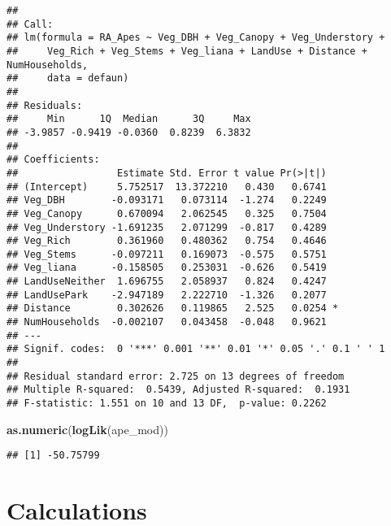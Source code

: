 \documentclass[]{book}
\newenvironment{Shaded}{\begin{snugshade}}{\end{snugshade}}
\newcommand{\KeywordTok}[1]{\textcolor[rgb]{0.13,0.29,0.53}{\textbf{#1}}}
\newcommand{\NormalTok}[1]{#1}
\begin{document}
\begin{verbatim}
## 
## Call:
## lm(formula = RA_Apes ~ Veg_DBH + Veg_Canopy + Veg_Understory + 
##     Veg_Rich + Veg_Stems + Veg_liana + LandUse + Distance + NumHouseholds, 
##     data = defaun)
## 
## Residuals:
##     Min      1Q  Median      3Q     Max 
## -3.9857 -0.9419 -0.0360  0.8239  6.3832 
## 
## Coefficients:
##                 Estimate Std. Error t value Pr(>|t|)  
## (Intercept)     5.752517  13.372210   0.430   0.6741  
## Veg_DBH        -0.093171   0.073114  -1.274   0.2249  
## Veg_Canopy      0.670094   2.062545   0.325   0.7504  
## Veg_Understory -1.691235   2.071299  -0.817   0.4289  
## Veg_Rich        0.361960   0.480362   0.754   0.4646  
## Veg_Stems      -0.097211   0.169073  -0.575   0.5751  
## Veg_liana      -0.158505   0.253031  -0.626   0.5419  
## LandUseNeither  1.696755   2.058937   0.824   0.4247  
## LandUsePark    -2.947189   2.222710  -1.326   0.2077  
## Distance        0.302626   0.119865   2.525   0.0254 *
## NumHouseholds  -0.002107   0.043458  -0.048   0.9621  
## ---
## Signif. codes:  0 '***' 0.001 '**' 0.01 '*' 0.05 '.' 0.1 ' ' 1
## 
## Residual standard error: 2.725 on 13 degrees of freedom
## Multiple R-squared:  0.5439, Adjusted R-squared:  0.1931 
## F-statistic: 1.551 on 10 and 13 DF,  p-value: 0.2262
\end{verbatim}

\begin{Shaded}
\begin{Highlighting}[]
\KeywordTok{as.numeric}\NormalTok{(}\KeywordTok{logLik}\NormalTok{(ape_mod))}
\end{Highlighting}
\end{Shaded}

\begin{verbatim}
## [1] -50.75799
\end{verbatim}

\hypertarget{calculations}{%
\section{Calculations}\label{calculations}}
\end{document}

